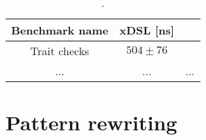 \begin{table}[H]
  \caption{.}
  \label{tab:ubenchmark-xdsl-regression}
  \centering
  \begin{tabular}{ccc}
    \toprule
    \textbf{Benchmark name} & \textbf{xDSL [ns]}\\
    \midrule
    Trait checks & $504 \pm 76$ \\
    ... & ... & ... \\
    \bottomrule
  \end{tabular}
\end{table}



\section{Pattern rewriting}







